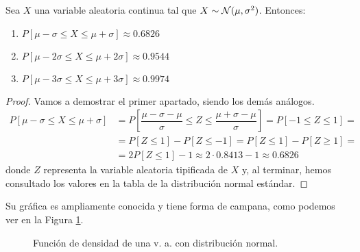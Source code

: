 \begin{teo}
    Sea $X$ una variable aleatoria continua tal que $X\sim \mathcal{N}(\mu,\sigma^2)$. Entonces:
    \begin{enumerate}
        \item $P[\mu-\sigma\leq X\leq \mu+\sigma] \approx 0.6826$
        \item $P[\mu-2\sigma\leq X\leq \mu+2\sigma] \approx 0.9544$
        \item $P[\mu-3\sigma\leq X\leq \mu+3\sigma] \approx 0.9974$
    \end{enumerate}
\end{teo}
\begin{proof}
    Vamos a demostrar el primer apartado, siendo los demás análogos.
    \begin{align*}
        P[\mu-\sigma\leq X\leq \mu+\sigma] &= P\left[\dfrac{\mu-\sigma-\mu}{\sigma} \leq Z\leq \dfrac{\mu+\sigma-\mu}{\sigma}\right]
        = P[-1\leq Z\leq 1] =\\&= P[Z\leq 1] - P[Z\leq -1]
        = P[Z\leq 1] -P[Z\geq 1]=\\&= 2P[Z\leq 1] -1 \approx 2\cdot 0.8413-1 \approx 0.6826
    \end{align*}
    donde $Z$ representa la variable aleatoria tipificada de $X$ y,
    al terminar, hemos consultado los valores en la tabla de la distribución normal estándar.
\end{proof}

Su gráfica es ampliamente conocida y tiene forma de campana, como podemos ver en la Figura \ref{fig:normal}.
\begin{figure}[H]
    \centering
    \caption{Función de densidad de una v. a. con distribución normal.}
    \label{fig:normal}
\end{figure}


